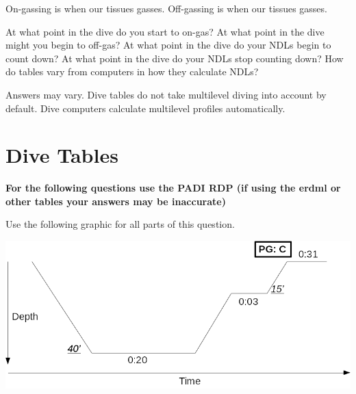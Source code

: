 \documentclass[12pt,letter]{exam}
\begin{document}
\begin{questions}
        \question On-gassing is when our tissues \fillin[absorb] gasses.
        \question Off-gassing is when our tissues \fillin[release] gasses.

        \question At what point in the dive do you start to on-gas? 
        \question At what point in the dive might you begin to off-gas? 
        \question At what point in the dive do your NDLs begin to count down? 
        \question At what point in the dive do your NDLs stop counting down? 
        \question How do tables vary from computers in how they calculate NDLs?
        \begin{solution}[2in]
            Answers may vary. Dive tables do not take multilevel diving into account by default. Dive computers calculate multilevel profiles automatically.
        \end{solution}

\section{Dive Tables}
\textbf{For the following questions use the PADI RDP (if using the erdml or other tables your answers may be inaccurate)}

        \question Use the following graphic for all parts of this question.

        \includegraphics[width=\textwidth]{img/profile.png}
\end{questions}
\end{document}
